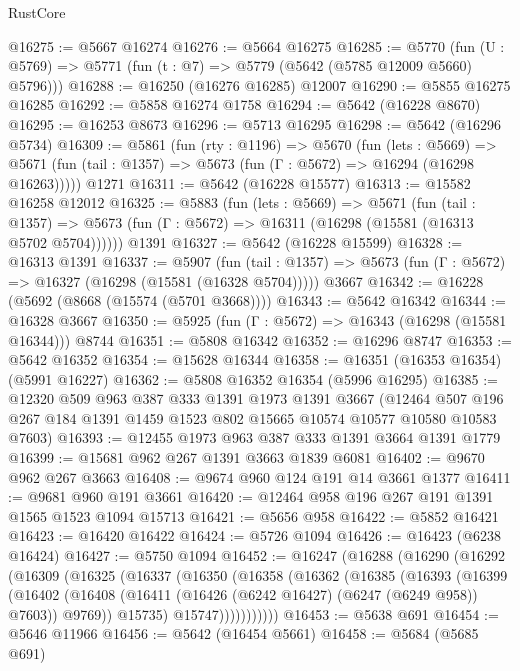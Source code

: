 \begin{lexlean}{RustCore}
\begin{coremodule}
@16275 := @5667 @16274
@16276 := @5664 @16275
@16285 := @5770
    (fun (U : @5769) => @5771 (fun (t : @7) => @5779 (@5642 (@5785 @12009 @5660) @5796)))
@16288 := @16250 (@16276 @16285) @12007
@16290 := @5855 @16275 @16285
@16292 := @5858 @16274 @1758
@16294 := @5642 (@16228 @8670)
@16295 := @16253 @8673
@16296 := @5713 @16295
@16298 := @5642 (@16296 @5734)
@16309 := @5861
    (fun (rty : @1196) =>
    @5670
      (fun (lets : @5669) =>
      @5671 (fun (tail : @1357) => @5673 (fun (Γ : @5672) => @16294 (@16298 @16263)))))
    @1271
@16311 := @5642 (@16228 @15577)
@16313 := @15582 @16258 @12012
@16325 := @5883
    (fun (lets : @5669) =>
    @5671
      (fun (tail : @1357) =>
      @5673 (fun (Γ : @5672) => @16311 (@16298 (@15581 (@16313 @5702 @5704))))))
    @1391
@16327 := @5642 (@16228 @15599)
@16328 := @16313 @1391
@16337 := @5907
    (fun (tail : @1357) => @5673 (fun (Γ : @5672) => @16327 (@16298 (@15581 (@16328 @5704)))))
    @3667
@16342 := @16228 (@5692 (@8668 (@15574 (@5701 @3668))))
@16343 := @5642 @16342
@16344 := @16328 @3667
@16350 := @5925 (fun (Γ : @5672) => @16343 (@16298 (@15581 @16344))) @8744
@16351 := @5808 @16342
@16352 := @16296 @8747
@16353 := @5642 @16352
@16354 := @15628 @16344
@16358 := @16351 (@16353 @16354) (@5991 @16227)
@16362 := @5808 @16352 @16354 (@5996 @16295)
@16385 := @12320
    @509
    @963
    @387
    @333
    @1391
    @1973
    @1391
    @3667
    (@12464 @507 @196 @267 @184 @1391 @1459 @1523 @802 @15665 @10574 @10577 @10580 @10583 @7603)
@16393 := @12455 @1973 @963 @387 @333 @1391 @3664 @1391 @1779
@16399 := @15681 @962 @267 @1391 @3663 @1839 @6081
@16402 := @9670 @962 @267 @3663
@16408 := @9674 @960 @124 @191 @14 @3661 @1377
@16411 := @9681 @960 @191 @3661
@16420 := @12464 @958 @196 @267 @191 @1391 @1565 @1523 @1094 @15713
@16421 := @5656 @958
@16422 := @5852 @16421
@16423 := @16420 @16422
@16424 := @5726 @1094
@16426 := @16423 (@6238 @16424)
@16427 := @5750 @1094
@16452 := @16247
    (@16288
      (@16290
        (@16292
          (@16309
            (@16325
              (@16337
                (@16350
                  (@16358
                    (@16362
                      (@16385
                        (@16393
                          (@16399
                            (@16402
                              (@16408
                                (@16411 (@16426 (@6242 @16427) (@6247 (@6249 @958)) @7603))
                                @9769))
                            @15735)
                          @15747)))))))))))
@16453 := @5638 @691
@16454 := @5646 @11966
@16456 := @5642 (@16454 @5661)
@16458 := @5684 (@5685 @691)

\end{coremodule}
\end{lexlean}
